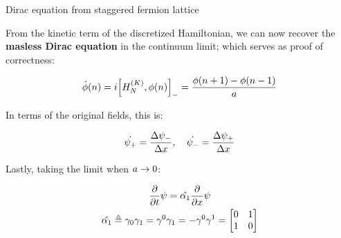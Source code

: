 \documentclass[9pt, aspectratio=169]{beamer}
\begin{document}
\begin{frame}{Dirac equation from staggered fermion lattice}

	From the kinetic term of the discretized Hamiltonian, we can now recover the \textbf{masless Dirac equation} in the continuum limit; which serves as proof of correctness:

	\begin{gather*}
	  \dot{\phi}(n) = i\com{H_{N}^{(K)}}{\phi(n)} = \frac{\phi(n+1)-\phi(n-1)}{a}
	\end{gather*}

	In terms of the original fields, this is:

	\begin{gather*}
	  \dot{\psi_{+}} = \frac{\Delta \psi_{-}}{\Delta x} \qc
	  \dot{\psi_{-}} = \frac{\Delta \psi_{+}}{\Delta x}
	\end{gather*}

	Lastly, taking the limit when $a \rightarrow 0$:

	\begin{gather*}
	  \pderivative{t}\psi = \hat{\alpha_1}\pderivative{x}\psi \\
	  \hat{\alpha_1} \defeq \gamma_{0}\gamma_{1} = \gamma^{0}\gamma_{1}
	    = -\gamma^{0}\gamma^{1} = \mqty[0 & 1 \\ 1 & 0]
	\end{gather*}

\end{frame}

\end{document}
